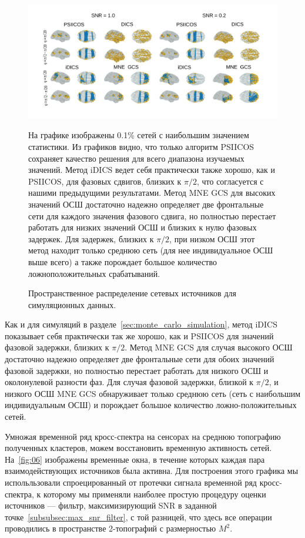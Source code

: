 \begin{figure}[!ht]
 \includegraphics[width=1\textwidth]{../images/psiicos_paper/Figure5_hr.jpg}
 \caption{Пространственное распределение сетевых источников для симуляционных данных.}\label{fig:05} %
     На графике изображены 0.1\% сетей с наибольшим значением
     статистики. Из графиков видно, что только алгоритм PSIICOS сохраняет
     качество решения для всего диапазона изучаемых значений.
     Метод iDICS ведет себя практически также хорошо, как и PSIICOS,
     для фазовых сдвигов, близких к $\pi/2$, что согласуется с нашими предыдущими
     результатами. Метод MNE GCS для высоких значений ОСШ достаточно надежно определяет
     две фронтальные сети для каждого значения фазового сдвига, но полностью перестает
     работать для низких значений ОСШ и близких к нулю фазовых задержек. Для задержек,
     близких к $\pi/2$, при низком ОСШ этот метод находит только среднюю сеть
     (для нее индивидуальное ОСШ выше всего) а также порождает большое количество
     ложноположительных срабатываний.
\end{figure}%

Как и для симуляций в разделе~\ref{sec:monte_carlo_simulation}, метод iDICS показывает себя
практически так же хорошо, как и PSIICOS для значений фазовой задержки, близких к $\pi/2$.
Метод MNE GCS для случая высокого ОСШ достаточно надежно определяет две фронтальные сети для
обоих значений фазовой задержки, но полностью перестает работать для низкого ОСШ и
околонулевой разности фаз. Для случая фазовой задержки, близкой к $\pi/2$, и низкого ОСШ
MNE GCS обнаруживает только среднюю сеть (сеть с наибольшим индивидуальным ОСШ) и
порождает большое количество ложно-положительных сетей.

Умножая временной ряд кросс-спектра на сенсорах на среднюю топографию
полученных кластеров, можем восстановить временную активность сетей.
На~\ref{fig:06} изображены временные окна, в течение которых каждая пара
взаимодействующих источников была активна.  Для построения этого графика мы
испольльзовали спроецированный от протечки сигнала временной ряд кросс-спектра,
к которому мы применяли наиболее простую процедуру оценки источников ---
фильтр, максимизирующий SNR в заданной точке~\ref{subsubsec:max_snr_filter}, с
той разницей, что здесь все операции проводились в пространстве 2-топографий с
размерностью $M^2$.

